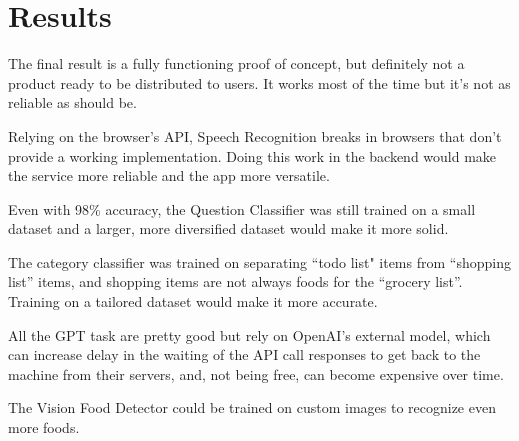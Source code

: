 \documentclass{article}
\begin{document}
\section*{\color{draculagreen}Results}

The final result is a fully functioning proof of concept, but definitely not a product ready to be distributed to users. It works most of the time but it's not as reliable as should be.

Relying on the browser's API, Speech Recognition breaks in browsers that don't provide a working implementation. Doing this work in the backend would make the service more reliable and the app more versatile.

Even with 98\% accuracy, the Question Classifier was still trained on a small dataset and a larger, more diversified dataset would make it more solid.

The category classifier was trained on separating ``todo list" items from ``shopping list'' items, and shopping items are not always foods for the ``grocery list''. Training on a tailored dataset would make it more accurate.

All the GPT task are pretty good but rely on OpenAI's external model, which can increase delay in the waiting of the API call responses to get back to the machine from their servers, and, not being free, can become expensive over time.

The Vision Food Detector could be trained on custom images to recognize even more foods.
\end{document}
